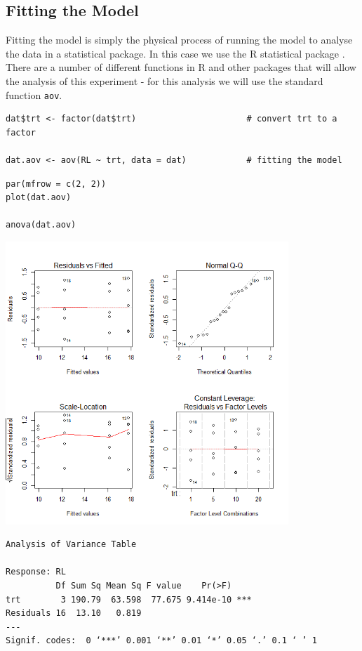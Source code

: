 \documentclass[a4paper, 10pt, fleqn, twosided]{memoir}
\begin{document}
\subsection{Fitting the Model}

Fitting the model is simply the physical process of running the model to analyse the data in a statistical package. In
this case we use the R statistical package \cite{r}. There are a number of different functions in R and other packages
that will allow the analysis of this experiment - for this analysis we will use the standard function \texttt{aov}.


\begin{tcolorbox}[title = Fitting the linear model for a CRD]
\begin{verbatim}
dat$trt <- factor(dat$trt)                      # convert trt to a factor

dat.aov <- aov(RL ~ trt, data = dat)            # fitting the model

\end{verbatim}

\tcblower
\begin{verbatim}
par(mfrow = c(2, 2))
plot(dat.aov)

anova(dat.aov)
\end{verbatim}
\end{tcolorbox}


\begin{tcolorbox}[title = Example 1 Output]
\includegraphics[width=0.8\textwidth, frame]{Example1Resplot.png}
\begin{verbatim}
Analysis of Variance Table

Response: RL
          Df Sum Sq Mean Sq F value    Pr(>F)
trt        3 190.79  63.598  77.675 9.414e-10 ***
Residuals 16  13.10   0.819
---
Signif. codes:  0 ‘***’ 0.001 ‘**’ 0.01 ‘*’ 0.05 ‘.’ 0.1 ‘ ’ 1
\end{verbatim}
\end{tcolorbox}
\end{document}
